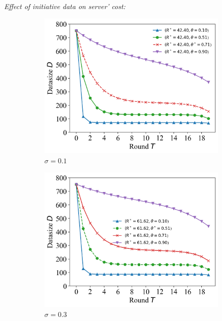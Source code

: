 \documentclass{article}
\theoremstyle{plain}
\theoremstyle{definition}
\theoremstyle{remark}
\begin{document}
\textit{Effect of initiative data on server' cost:}
\begin{figure}
	\begin{subfigure}{0.31\textwidth}
		\centering
    \includegraphics[width=\textwidth]{figures/figure_63_A.png}
    \caption{$\sigma=0.1$}
	\end{subfigure}
  \quad
	\begin{subfigure}{0.31\textwidth}
		\centering
		\includegraphics[width=\textwidth]{figures/figure_63_B.png}
    \caption{$\sigma=0.3$}
	\end{subfigure}
  \quad
  \begin{subfigure}{0.31\textwidth}
		\centering

\end{subfigure}
\end{figure}
\end{document}

